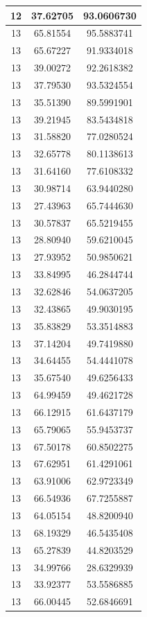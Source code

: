 \documentclass[
]{book}
\begin{document}
\begin{tabular}{c|c|c}
\hline
12 & 37.62705 & 93.0606730\\
\hline
13 & 65.81554 & 95.5883741\\
\hline
13 & 65.67227 & 91.9334018\\
\hline
13 & 39.00272 & 92.2618382\\
\hline
13 & 37.79530 & 93.5324554\\
\hline
13 & 35.51390 & 89.5991901\\
\hline
13 & 39.21945 & 83.5434818\\
\hline
13 & 31.58820 & 77.0280524\\
\hline
13 & 32.65778 & 80.1138613\\
\hline
13 & 31.64160 & 77.6108332\\
\hline
13 & 30.98714 & 63.9440280\\
\hline
13 & 27.43963 & 65.7444630\\
\hline
13 & 30.57837 & 65.5219455\\
\hline
13 & 28.80940 & 59.6210045\\
\hline
13 & 27.93952 & 50.9850621\\
\hline
13 & 33.84995 & 46.2844744\\
\hline
13 & 32.62846 & 54.0637205\\
\hline
13 & 32.43865 & 49.9030195\\
\hline
13 & 35.83829 & 53.3514883\\
\hline
13 & 37.14204 & 49.7419880\\
\hline
13 & 34.64455 & 54.4441078\\
\hline
13 & 35.67540 & 49.6256433\\
\hline
13 & 64.99459 & 49.4621728\\
\hline
13 & 66.12915 & 61.6437179\\
\hline
13 & 65.79065 & 55.9453737\\
\hline
13 & 67.50178 & 60.8502275\\
\hline
13 & 67.62951 & 61.4291061\\
\hline
13 & 63.91006 & 62.9723349\\
\hline
13 & 66.54936 & 67.7255887\\
\hline
13 & 64.05154 & 48.8200940\\
\hline
13 & 68.19329 & 46.5435408\\
\hline
13 & 65.27839 & 44.8203529\\
\hline
13 & 34.99766 & 28.6329939\\
\hline
13 & 33.92377 & 53.5586885\\
\hline
13 & 66.00445 & 52.6846691\\

\end{tabular}
\end{document}
